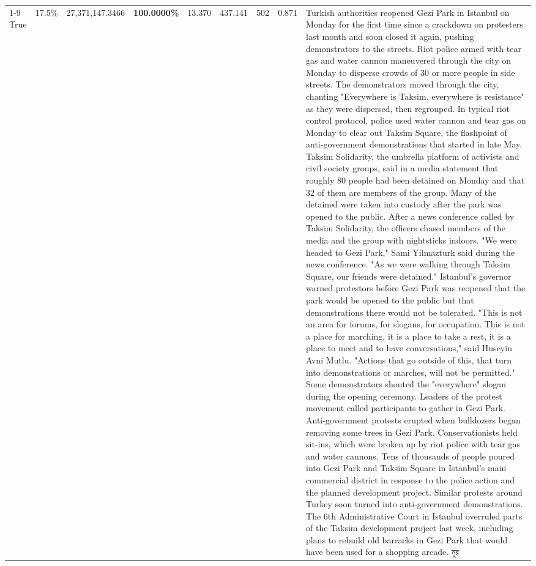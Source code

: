 \begin{table}[H]
\begin{tabular}{lllrlllll}
\cline{1-9}
True & 17.5\% & 27,371,147.3466 & \bfseries \color{red} 100.0000\% & 13.370 & 437.141 & 502 & 0.871 & Turkish authorities reopened Gezi Park in Istanbul on Monday for the first time since a crackdown on protesters last month and soon closed it again, pushing demonstrators to the streets. Riot police armed with tear gas and water cannon maneuvered through the city on Monday to disperse crowds of 30 or more people in side streets. The demonstrators moved through the city, chanting "Everywhere is Taksim, everywhere is resistance" as they were dispersed, then regrouped. In typical riot control protocol, police used water cannon and tear gas on Monday to clear out Taksim Square, the flashpoint of anti-government demonstrations that started in late May. Taksim Solidarity, the umbrella platform of activists and civil society groups, said in a media statement that roughly 80 people had been detained on Monday and that 32 of them are members of the group. Many of the detained were taken into custody after the park was opened to the public. After a news conference called by Taksim Solidarity, the officers chased members of the media and the group with nightsticks indoors. "We were headed to Gezi Park," Sami Yilmazturk said during the news conference. "As we were walking through Taksim Square, our friends were detained." Istanbul's governor warned protestors before Gezi Park was reopened that the park would be opened to the public but that demonstrations there would not be tolerated. "This is not an area for forums, for slogans, for occupation. This is not a place for marching, it is a place to take a rest, it is a place to meet and to have conversations," said Huseyin Avni Mutlu. "Actions that go outside of this, that turn into demonstrations or marches, will not be permitted." Some demonstrators shouted the "everywhere" slogan during the opening ceremony. Leaders of the protest movement called participants to gather in Gezi Park. Anti-government protests erupted when bulldozers began removing some trees in Gezi Park. Conservationists held sit-ins, which were broken up by riot police with tear gas and water cannons. Tens of thousands of people poured into Gezi Park and Taksim Square in Istanbul's main commercial district in response to the police action and the planned development project. Similar protests around Turkey soon turned into anti-government demonstrations. The 6th Administrative Court in Istanbul overruled parts of the Taksim development project last week, including plans to rebuild old barracks in Gezi Park that would have been used for a shopping arcade. মুর \\

\end{tabular}
\end{table}
